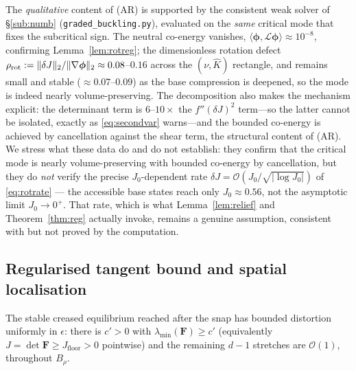 \begin{remark}
    \label{rem:rotnum}
    The \emph{qualitative} content of (AR) is supported by the consistent weak solver of \S\ref{sub:numb}
    (\texttt{graded\_buckling.py}), evaluated on the \emph{same} critical mode that fixes the subcritical sign. The
    neutral co-energy vanishes, $\langle\bm{\phi},\mathcal{L}\bm{\phi}\rangle\approx10^{-8}$, confirming
    Lemma~\ref{lem:rotreg}; the dimensionless rotation defect
    $\rho_{\mathrm{rot}}:=\|\delta J\|_2/\|\nabla\bm{\phi}\|_2\approx0.08$--$0.16$ across the $(\nu,\hat K)$ rectangle, and
    remains small and stable ($\approx0.07$--$0.09$) as the base compression is deepened, so the mode is indeed nearly
    volume-preserving. The decomposition also makes the mechanism explicit: the determinant term is $6$--$10\times$ the
    $f''(\delta J)^2$ term---so the latter cannot be isolated, exactly as \eqref{eq:secondvar} warns---and the bounded
    co-energy is achieved by cancellation against the shear term, the structural content of (AR). We stress what these
    data do and do not establish: they confirm that the critical mode is nearly volume-preserving with bounded co-energy
    by cancellation, but they do \emph{not} verify the precise $J_0$-dependent rate $\delta J=\mathcal{O}(J_0/\sqrt{|\log
    J_0|})$ of \eqref{eq:rotrate} --- the accessible base states reach only $J_0\approx0.56$, not the asymptotic limit
    $J_0\to0^+$. That rate, which is what Lemma~\ref{lem:relief} and Theorem~\ref{thm:reg} actually invoke, remains a
    genuine assumption, consistent with but not proved by the computation.
\end{remark}

\subsection{Regularised tangent bound and spatial localisation}

\begin{assumption}
    \label{ass:nd}
    The stable creased equilibrium reached after the snap has bounded distortion uniformly in $\epsilon$: there is
    $c'>0$ with $\lambda_{\min}(\bm{F})\ge c'$ (equivalently $J=\det\bm{F}\ge J_{\mathrm{floor}}>0$ pointwise) and the
    remaining $d-1$ stretches are $\mathcal{O}(1)$, throughout $B_\rho$.
\end{assumption}


